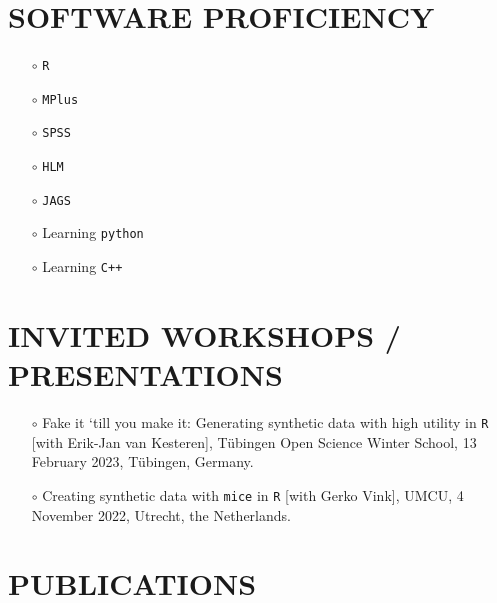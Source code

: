 \documentclass[11pt,a4paper,roman,colorlinks,linkcolor = blue]{moderncv}        %
\begin{document}

\section{SOFTWARE PROFICIENCY}
{\begin{minipage}{\maincolumnwidth}%
	\small{
  \begin{itemize}
    \item[$\circ$] \texttt{R}
    \item[$\circ$] \texttt{MPlus}
    \item[$\circ$] \texttt{SPSS}
    \item[$\circ$] \texttt{HLM}
    \item[$\circ$] \texttt{JAGS}
    \item[$\circ$] Learning \texttt{python}
    \item[$\circ$] Learning \texttt{C++}
  \end{itemize}}
\end{minipage}}

\section{INVITED WORKSHOPS / PRESENTATIONS}

\begin{itemize}

\item[$\circ$] Fake it ‘till you make it: Generating synthetic data with high utility in \texttt{R} [with Erik-Jan van Kesteren], T{\"u}bingen Open Science Winter School, 13 February 2023, T{\"u}bingen, Germany.

\item[$\circ$] Creating synthetic data with \texttt{mice} in \texttt{R} [with Gerko Vink], UMCU, 4 November
2022, Utrecht, the Netherlands.

\end{itemize}


\section{PUBLICATIONS}
\end{document}
